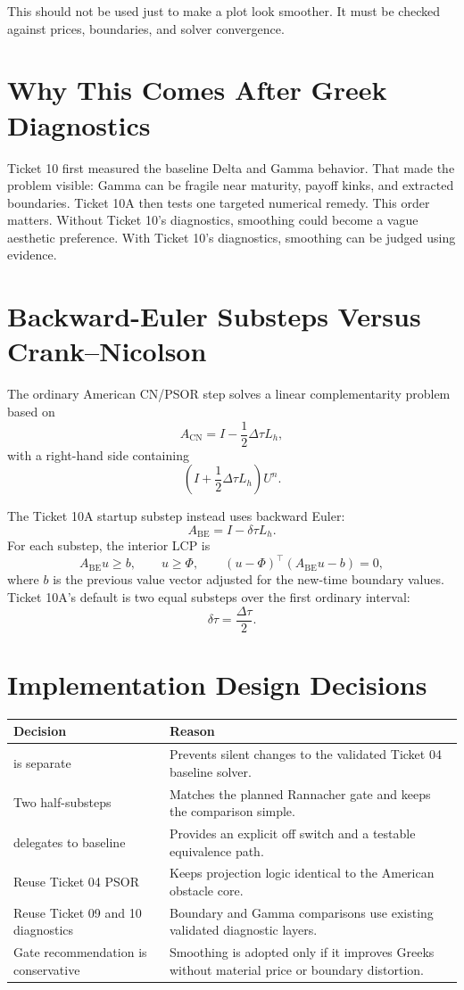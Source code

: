 \documentclass[11pt,a4paper]{article}
\begin{document}
This should not be used just to make a plot look smoother. It must be checked against prices,
boundaries, and solver convergence.

\section{Why This Comes After Greek Diagnostics}

Ticket 10 first measured the baseline Delta and Gamma behavior. That made the problem visible:
Gamma can be fragile near maturity, payoff kinks, and extracted boundaries. Ticket 10A then tests
one targeted numerical remedy. This order matters. Without Ticket 10's diagnostics, smoothing
could become a vague aesthetic preference. With Ticket 10's diagnostics, smoothing can be judged
using evidence.

\section{Backward-Euler Substeps Versus Crank--Nicolson}

The ordinary American CN/PSOR step solves a linear complementarity problem based on
\[
A_{\mathrm{CN}} = I - \frac{1}{2}\Delta\tau L_h,
\]
with a right-hand side containing
\[
\left(I + \frac{1}{2}\Delta\tau L_h\right)U^n.
\]

The Ticket 10A startup substep instead uses backward Euler:
\[
A_{\mathrm{BE}} = I - \delta\tau L_h.
\]
For each substep, the interior LCP is
\[
A_{\mathrm{BE}}u \ge b,\qquad u\ge \Phi,\qquad
(u-\Phi)^\top(A_{\mathrm{BE}}u-b)=0,
\]
where \(b\) is the previous value vector adjusted for the new-time boundary values. Ticket 10A's
default is two equal substeps over the first ordinary interval:
\[
\delta\tau=\frac{\Delta\tau}{2}.
\]

\section{Implementation Design Decisions}

\begin{longtable}{P{0.32\textwidth}L{0.50\textwidth}}
\toprule
Decision & Reason \\
\midrule
\endhead
{} is separate & Prevents silent changes to the validated Ticket 04 baseline solver. \\
Two half-substeps & Matches the planned Rannacher gate and keeps the comparison simple. \\
 delegates to baseline & Provides an explicit off switch and a testable equivalence path. \\
Reuse Ticket 04 PSOR & Keeps projection logic identical to the American obstacle core. \\
Reuse Ticket 09 and 10 diagnostics & Boundary and Gamma comparisons use existing validated diagnostic layers. \\
Gate recommendation is conservative & Smoothing is adopted only if it improves Greeks without material price or boundary distortion. \\
\bottomrule
\end{longtable}
\end{document}
